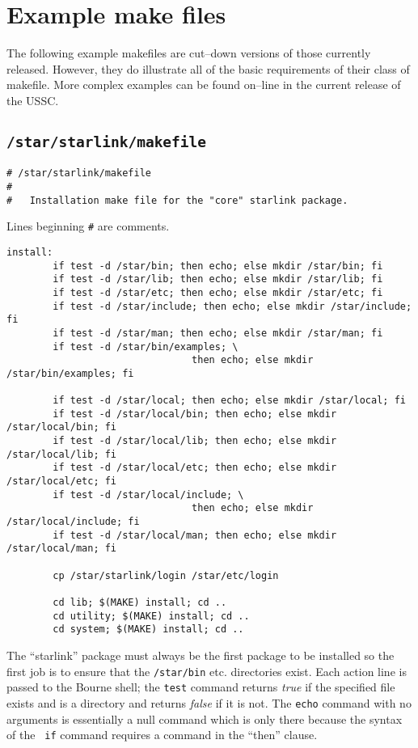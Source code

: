\appendix
\section{Example make files}

The following example makefiles are cut--down versions of those currently
released. However, they do illustrate all of the basic requirements of
their class of makefile. More complex examples can be found on--line in
the current release of the USSC.


\subsection{\tt /star/starlink/makefile}
\begin{verbatim}
# /star/starlink/makefile
#
#   Installation make file for the "core" starlink package.
\end{verbatim}
Lines beginning {\tt\#} are comments.
\begin{verbatim}
install:
        if test -d /star/bin; then echo; else mkdir /star/bin; fi
        if test -d /star/lib; then echo; else mkdir /star/lib; fi
        if test -d /star/etc; then echo; else mkdir /star/etc; fi
        if test -d /star/include; then echo; else mkdir /star/include; fi
        if test -d /star/man; then echo; else mkdir /star/man; fi
        if test -d /star/bin/examples; \
                                then echo; else mkdir /star/bin/examples; fi

        if test -d /star/local; then echo; else mkdir /star/local; fi
        if test -d /star/local/bin; then echo; else mkdir /star/local/bin; fi
        if test -d /star/local/lib; then echo; else mkdir /star/local/lib; fi
        if test -d /star/local/etc; then echo; else mkdir /star/local/etc; fi
        if test -d /star/local/include; \
                                then echo; else mkdir /star/local/include; fi
        if test -d /star/local/man; then echo; else mkdir /star/local/man; fi

        cp /star/starlink/login /star/etc/login

        cd lib; $(MAKE) install; cd ..
        cd utility; $(MAKE) install; cd ..
        cd system; $(MAKE) install; cd ..

\end{verbatim}
The ``starlink'' package must always be the first package to be installed so
the first job is to ensure that the {\tt /star/bin} etc. directories exist.
Each action line is passed to the Bourne shell; the {\tt test} command
returns {\em true} if the specified file exists and is a directory and returns
{\em false} if it is not. The {\tt echo} command with no arguments is
essentially a null command which is only there because the syntax of the {\tt
if} command requires a command in the ``then'' clause.


